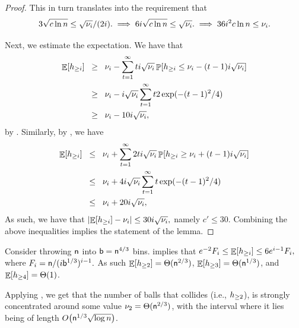 \begin{proof}
    This in turn translates into the requirement that 
    \begin{equation*}
        3\sqrt{c \ln n} \leq \sqrt{ \medianC_i}/(2i).%
        \implies%
        6i\sqrt{c \ln n} \leq \sqrt{ \medianC_i}.%
        \implies%
        36i^2 c \ln n \leq \medianC_i.%
    \end{equation*}    

    Next, we estimate the expectation. We have that
    \begin{align*}
        \Ex{ \NHX{i}} %
        &\GEQ%
        \medianC_i  - \sum_{t=1}^\infty t i \sqrt{ \medianC_i}
        \Prob{ \NHX{i} \leq  \medianC_i - (t-1)i\sqrt{ \medianC_i}}%
        \\&
        \GEQ%
        \medianC_i  - i \sqrt{ \medianC_i} \sum_{t=1}^\infty t 
        2\exp(-(t-1)^2/4)%
        \\& 
        \GEQ %
        \medianC_i  - 10 i \sqrt{ \medianC_i},
    \end{align*}
    by . Similarly, by , we
    have
    \begin{align*}
        \Ex{ \NHX{i}} %
        &\LEQ%
        \medianC_i  + \sum_{t=1}^\infty 2ti \sqrt{ \medianC_i}
        \Prob{ \NHX{i} \geq  \medianC_i + (t-1)i\sqrt{ \medianC_i}}%
        \\&
        \LEQ%
        \medianC_i  + 4 i \sqrt{ \medianC_i} \sum_{t=1}^\infty t 
        \exp(-(t-1)^2/4)%
        \\&
        \LEQ %
        \medianC_i  + 20 i \sqrt{ \medianC_i},
    \end{align*}
    As such, we have that
    \begin{math}
        \left| { \mathop{\mathbb{E}}\!\left[ { h_{\geq i}} \right] - \nu_i } \right| \leq 30 i \sqrt{
           \nu_i},
    \end{math}
    namely $c' \leq 30$. Combining the above inequalities implies the
    statement of the lemma.
\end{proof}

\begin{example}
    Consider throwing $\mathsf{n}$ into $\mathsf{b} = \mathsf{n}^{4/3}$ bins.
     implies that
    \begin{math}
        e^{-2} F_i \leq%
        \Ex{\NHX{i}} %
        \leq 6e^{i-1} F_i,
    \end{math}
    where
    \begin{math}
        F_i = \mathsf{n} / ( i \mathsf{b}^{1/3})^{i-1}.
    \end{math}
    As such $ \mathop{\mathbb{E}}\!\left[ {h_{\geq 2}} \right] = \Theta( \mathsf{n}^{2/3})$,
    $ \mathop{\mathbb{E}}\!\left[ {h_{\geq 3}} \right] = \Theta( \mathsf{n}^{1/3})$, and
    $ \mathop{\mathbb{E}}\!\left[ {h_{\geq 4}} \right] = \Theta( 1 )$.

    Applying , we get that the number of
    balls that collides (i.e., $h_{\geq 2}$), is strongly concentrated
    around some value $\nu_2 =\Theta( \mathsf{n}^{2/3})$, with the
    interval where it lies being of length
    $O\bigl( \mathsf{n}^{1/3} \sqrt{\log n}\bigr)$.
\end{example}



